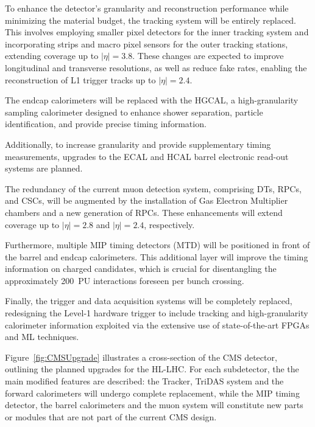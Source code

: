 To enhance the detector's granularity and reconstruction performance while minimizing the material budget, the tracking system will be entirely replaced. This involves employing smaller pixel detectors for the inner tracking system and incorporating strips and macro pixel sensors for the outer tracking stations, extending coverage up to $|\eta|=3.8$. These changes are expected to improve longitudinal and transverse resolutions, as well as reduce fake rates, enabling the reconstruction of L1 trigger tracks up to $|\eta|=2.4$.

The endcap calorimeters will be replaced with the HGCAL, a high-granularity sampling calorimeter designed to enhance shower separation, particle identification, and provide precise timing information.

Additionally, to increase granularity and provide supplementary timing measurements, upgrades to the ECAL and HCAL barrel electronic read-out systems are planned. 

The redundancy of the current muon detection system, comprising DTs, RPCs, and CSCs, will be augmented by the installation of Gas Electron Multiplier chambers and a new generation of RPCs. These enhancements will extend coverage up to $|\eta|=2.8$ and $|\eta|=2.4$, respectively.

Furthermore, multiple MIP timing detectors (MTD) will be positioned in front of the barrel and endcap calorimeters. This additional layer will improve the timing information on charged candidates, which is crucial for disentangling the approximately 200~PU interactions foreseen per bunch crossing.

Finally, the trigger and data acquisition systems will be completely replaced, redesigning the Level-1 hardware trigger to include tracking and high-granularity calorimeter information exploited via the extensive use of state-of-the-art FPGAs and ML techniques.

\bigbreak

Figure~\ref{fig:CMSUpgrade} illustrates a cross-section of the CMS detector, outlining the planned upgrades for the HL-LHC. For each subdetector, the the main modified features are described: the Tracker, TriDAS system and the forward calorimeters will undergo complete replacement, while the MIP timing detector, the barrel calorimeters and the muon system will constitute new parts or modules that are not part of the current CMS design.

